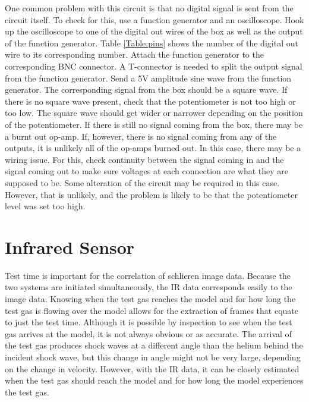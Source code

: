 One common problem with this circuit is that no digital signal is sent from the circuit itself. To check for this, use a function generator and an oscilloscope. Hook up the oscilloscope to one of the digital out wires of the box as well as the output of the function generator. Table \ref{Table:pins} shows the number of the digital out wire to its corresponding number. Attach the function generator to the corresponding BNC connector. A T-connector is needed to split the output signal from the function generator. Send a 5V amplitude sine wave from the function generator. The corresponding signal from the box should be a square wave. If there is no square wave present, check that the potentiometer is not too high or too low. The square wave should get wider or narrower depending on the position of the potentiometer. If there is still no signal coming from the box, there may be a burnt out op-amp. If, however, there is no signal coming from any of the outputs, it is unlikely all of the op-amps burned out. In this case, there may be a wiring issue. For this, check continuity between the signal coming in and the signal coming out to make sure voltages at each connection are what they are supposed to be. Some alteration of the circuit may be required in this case. However, that is unlikely, and the problem is likely to be that the potentiometer level was set too high.





\section{Infrared Sensor}

Test time is important for the correlation of schlieren image data. Because the two systems are initiated simultaneously, the IR data corresponds easily to the image data. Knowing when the test gas reaches the model and for how long the test gas is flowing over the model allows for the extraction of frames that equate to just the test time. Although it is possible by inspection to see when the test gas arrives at the model, it is not always obvious or as accurate. The arrival of the test gas produces shock waves at a different angle than the helium behind the incident shock wave, but this change in angle might not be very large, depending on the change in velocity. However, with the IR data, it can be closely estimated when the test gas should reach the model and for how long the model experiences the test gas. 


